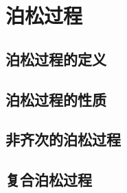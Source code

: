 \section{泊松过程}
    \subsection{泊松过程的定义}
    \subsection{泊松过程的性质}
    \subsection{非齐次的泊松过程}
    \subsection{复合泊松过程}
    